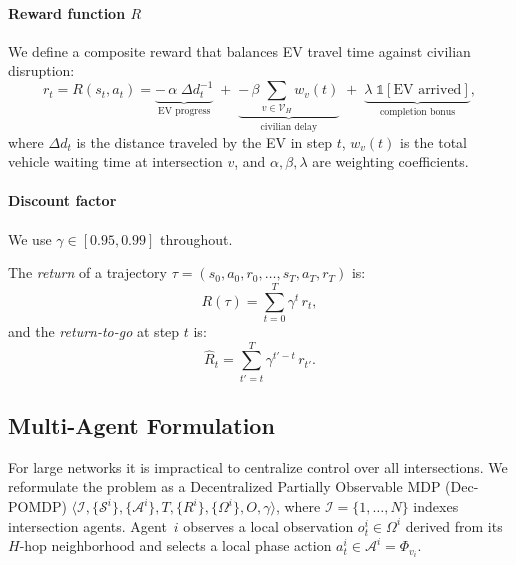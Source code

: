 \documentclass[journal]{IEEEtran}
\newcommand{\Rtg}{\widehat{R}}
\begin{document}
\paragraph{Reward function $R$}
We define a composite reward that balances EV travel time against
civilian disruption:
\begin{equation}
  r_t = R(s_t, a_t) =
    \underbrace{-\,\alpha\;\Delta d_t^{-1}}_{\text{EV progress}}
    \;+\;
    \underbrace{-\,\beta \sum_{v \in \mathcal{V}_H}
      w_v(t)}_{\text{civilian delay}}
    \;+\;
    \underbrace{\lambda\;\mathbb{1}[\text{EV arrived}]}_{\text{completion bonus}},
  \label{eq:reward}
\end{equation}
where $\Delta d_t$ is the distance traveled by the EV in step $t$,
$w_v(t)$ is the total vehicle waiting time at intersection $v$, and
$\alpha, \beta, \lambda$ are weighting coefficients.

\paragraph{Discount factor}
We use $\gamma \in [0.95, 0.99]$ throughout.

The \emph{return} of a trajectory $\tau = (s_0, a_0, r_0, \ldots,
s_T, a_T, r_T)$ is:
\begin{equation}
  R(\tau) = \sum_{t=0}^{T} \gamma^t \, r_t,
  \label{eq:return}
\end{equation}
and the \emph{return-to-go} at step $t$ is:
\begin{equation}
  \Rtg_t = \sum_{t'=t}^{T} \gamma^{t'-t}\, r_{t'}.
  \label{eq:rtg}
\end{equation}

\subsection{Multi-Agent Formulation}
\label{sec:formulation:marl}

For large networks it is impractical to centralize control over all
intersections.  We reformulate the problem as a Decentralized Partially
Observable MDP (Dec-POMDP)
$\langle \mathcal{I}, \{\mathcal{S}^i\}, \{\mathcal{A}^i\},
T, \{R^i\}, \{\Omega^i\}, O, \gamma \rangle$,
where $\mathcal{I} = \{1, \ldots, N\}$ indexes intersection agents.
Agent~$i$ observes a local observation $o_t^i \in \Omega^i$ derived
from its $H$-hop neighborhood and selects a local phase action
$a_t^i \in \mathcal{A}^i = \Phi_{v_i}$.
\end{document}
